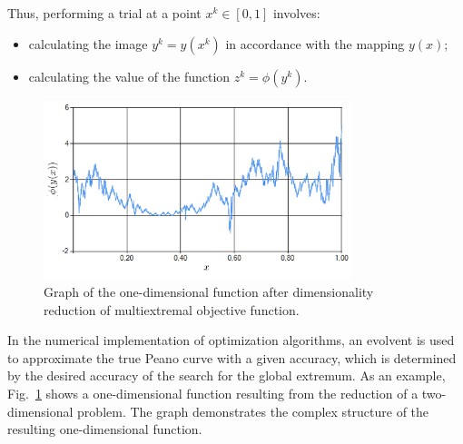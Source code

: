 \documentclass[runningheads]{llncs}
\begin{document}
Thus, performing a trial at a point $x^k \in [0,1]$ involves:
\begin{itemize}
    \item calculating the image $y^k=y(x^k)$ in accordance with the mapping $y(x)$;
    \item calculating the value of the function $z^k=\phi(y^k)$.
\end{itemize}

%
%
%
%

\begin{figure}
\center
\includegraphics[width=0.8\textwidth]{fig1.png}
\caption{Graph of the one-dimensional function after dimensionality reduction of multiextremal objective function.} \label{fig1}
\end{figure}

In the numerical implementation of optimization algorithms, an evolvent is used to approximate the true Peano curve with a given accuracy, which is determined by the desired accuracy of the search for the global extremum. As an example, Fig.~\ref{fig1} shows a one-dimensional function resulting from the reduction of a two-dimensional problem. The graph demonstrates the complex structure of the resulting one-dimensional function.
\end{document}
